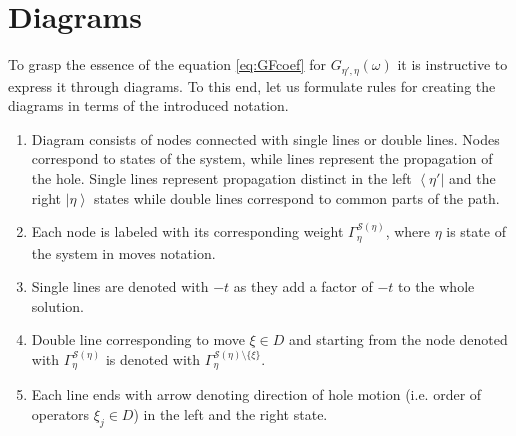 \documentclass[%
 reprint,
 amsmath,amssymb,
 aps,
prb,
floatfix,
]{revtex4-1}
\newcommand{\ket}[1]{\left\vert #1 \right\rangle}
\newcommand{\bra}[1]{\left\langle #1 \right\vert}
\begin{document}
\section{\label{sec:appendix:diagrams}Diagrams}

To grasp the essence of the equation \eqref{eq:GFcoef} for $G_{\eta', \eta}(\omega)$ it is instructive to express it through diagrams. To this end, let us formulate rules for creating the diagrams in terms of the introduced notation. 
\begin{enumerate}
    \item Diagram consists of nodes connected with single lines or double lines. Nodes correspond to states of the system, while lines represent the propagation of the hole. Single lines represent propagation distinct in the left $\bra{\eta'}$ and the right $\ket{\eta}$ states while double lines correspond to common parts of the path.
    \item Each node is labeled with its corresponding weight $\Gamma_{\eta}^{\mathcal{S}(\eta)}$, where $\eta$ is state of the system in moves notation.
    \item Single lines are denoted with $-t$ as they add a factor of $-t$ to the whole solution.
    \item Double line corresponding to move $\xi \in D$ and starting from the node denoted with $\Gamma_{\eta}^{\mathcal{S}(\eta)}$ is denoted with $\Gamma_{\eta}^{\mathcal{S}(\eta) \setminus \{\xi\}}$.
    \item Each line ends with arrow denoting direction of hole motion (i.e. order of operators $\xi_j \in D$) in the left and the right state.
\end{enumerate}
\end{document}
